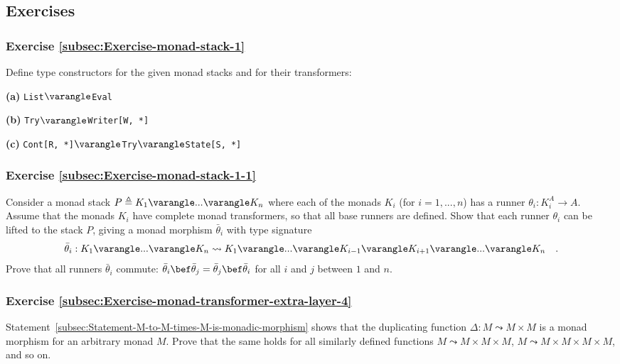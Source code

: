 \subsection{Exercises}

\subsubsection{Exercise \label{subsec:Exercise-monad-stack-1}\ref{subsec:Exercise-monad-stack-1}}

Define type constructors for the given monad stacks and for their
transformers:

\textbf{(a)} \lstinline!List!$\varangle$\lstinline!Eval!

\textbf{(b)} \lstinline!Try!$\varangle$\lstinline!Writer[W, *]!

\textbf{(c)} \lstinline!Cont[R, *]!$\varangle$\lstinline!Try!$\varangle$\lstinline!State[S, *]!

\subsubsection{Exercise \label{subsec:Exercise-monad-stack-1-1}\ref{subsec:Exercise-monad-stack-1-1}}

Consider a monad stack $P\triangleq K_{1}\varangle...\varangle K_{n}$
where each of the monads $K_{i}$ (for $i=1,...,n$) has a runner
$\theta_{i}:K_{i}^{A}\rightarrow A$. Assume that the monads $K_{i}$
have complete monad transformers, so that all base runners are defined.
Show that each runner $\theta_{i}$ can be lifted to the stack $P$,
giving a monad morphism $\bar{\theta}_{i}$ with type signature
\[
\bar{\theta}_{i}:K_{1}\varangle...\varangle K_{n}\leadsto K_{1}\varangle...\varangle K_{i-1}\varangle K_{i+1}\varangle...\varangle K_{n}\quad.
\]
Prove that all runners $\bar{\theta}_{i}$ commute: $\bar{\theta}_{i}\bef\bar{\theta}_{j}=\bar{\theta}_{j}\bef\bar{\theta}_{i}$
for all $i$ and $j$ between $1$ and $n$.

\subsubsection{Exercise \label{subsec:Exercise-monad-transformer-extra-layer-4}\ref{subsec:Exercise-monad-transformer-extra-layer-4} }

Statement~\ref{subsec:Statement-M-to-M-times-M-is-monadic-morphism}
shows that the duplicating function $\Delta:M\leadsto M\times M$
is a monad morphism for an arbitrary monad $M$. Prove that the same
holds for all similarly defined functions $M\leadsto M\times M\times M$,
$M\leadsto M\times M\times M\times M$, and so on.

